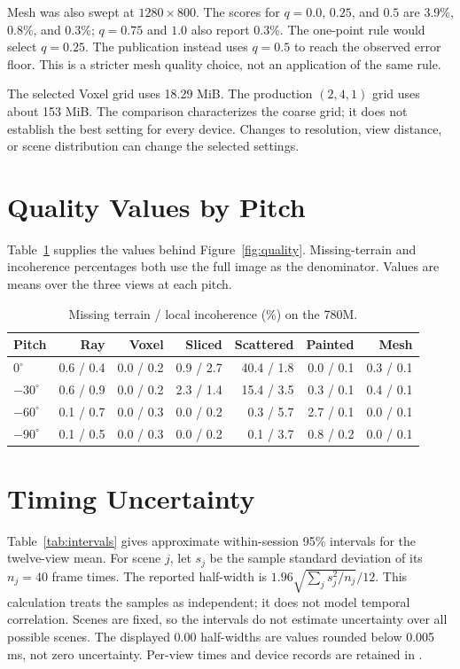\documentclass{jcgt}
\begin{document}
Mesh was also swept at $1280\times800$. The scores for $q=0.0$, $0.25$, and $0.5$ are 3.9\%, 0.8\%, and 0.3\%; $q=0.75$ and $1.0$ also report 0.3\%. The one-point rule would select $q=0.25$. The publication instead uses $q=0.5$ to reach the observed error floor. This is a stricter mesh quality choice, not an application of the same rule.

The selected Voxel grid uses 18.29 MiB. The production $(2,4,1)$ grid uses about 153 MiB. The comparison characterizes the coarse grid; it does not establish the best setting for every device. Changes to resolution, view distance, or scene distribution can change the selected settings.

\section{Quality Values by Pitch}\label{sec:quality-detail}

Table~\ref{tab:quality} supplies the values behind Figure~\ref{fig:quality}. Missing-terrain and incoherence percentages both use the full image as the denominator. Values are means over the three views at each pitch.

\begin{table}[htbp]\centering\small
\caption{Missing terrain / local incoherence (\%) on the 780M.}\label{tab:quality}
\setlength{\tabcolsep}{3pt}
\begin{tabular}{@{}lrrrrrr@{}}
\toprule
Pitch & Ray & Voxel & Sliced & Scattered & Painted & Mesh \\
\midrule
$0^\circ$ & 0.6 / 0.4 & 0.0 / 0.2 & 0.9 / 2.7 & 40.4 / 1.8 & 0.0 / 0.1 & 0.3 / 0.1 \\
$-30^\circ$ & 0.6 / 0.9 & 0.0 / 0.2 & 2.3 / 1.4 & 15.4 / 3.5 & 0.3 / 0.1 & 0.4 / 0.1 \\
$-60^\circ$ & 0.1 / 0.7 & 0.0 / 0.3 & 0.0 / 0.2 & 0.3 / 5.7 & 2.7 / 0.1 & 0.0 / 0.1 \\
$-90^\circ$ & 0.1 / 0.5 & 0.0 / 0.3 & 0.0 / 0.2 & 0.1 / 3.7 & 0.8 / 0.2 & 0.0 / 0.1 \\
\bottomrule
\end{tabular}
\end{table}

\section{Timing Uncertainty}\label{sec:timing-detail}

Table~\ref{tab:intervals} gives approximate within-session 95\% intervals for the twelve-view mean. For scene $j$, let $s_j$ be the sample standard deviation of its $n_j=40$ frame times. The reported half-width is $1.96\sqrt{\sum_j s_j^2/n_j}/12$. This calculation treats the samples as independent; it does not model temporal correlation. Scenes are fixed, so the intervals do not estimate uncertainty over all possible scenes. The displayed $0.00$ half-widths are values rounded below 0.005 ms, not zero uncertainty. Per-view times and device records are retained in .
\end{document}
